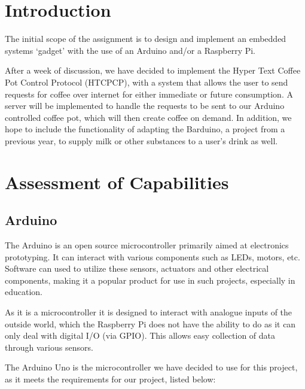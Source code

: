 \documentclass[12pt, a4paper]{article}
\begin{document}

\section{Introduction}
The initial scope of the assignment is to design and implement an embedded
systems `gadget' with the use of an Arduino and/or a Raspberry Pi.

After a week of discussion, we have decided to implement the Hyper Text 
Coffee Pot Control Protocol (HTCPCP)\cite{HTCPCP}, with a system that allows
the user to send requests for coffee over  internet for either immediate or
future consumption. A server will be implemented to handle the requests to be
sent to our Arduino controlled coffee pot, which will then create coffee on
demand. In addition, we hope to include the functionality of adapting the
Barduino, a project from a previous year, to supply milk or other substances to
a user’s drink as well.
\newpage


\section{Assessment of Capabilities}
\subsection{Arduino}
The Arduino is an open source microcontroller primarily aimed at electronics
prototyping. It can interact with various components such as LEDs, motors, etc.
Software can used to utilize these sensors, actuators and other electrical
components, making it a popular product for use in such projects, especially in
education.

As it is a microcontroller it is designed to interact with analogue inputs of
the outside world, which the Raspberry Pi does not have the ability to do as it
can only deal with digital I/O (via GPIO). This allows easy collection of data
through various sensors. 

The Arduino Uno is the microcontroller we have decided to use for this project,
as it meets the requirements for our project, listed below:
\end{document}
